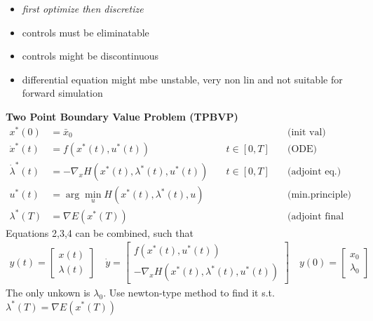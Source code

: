 
\begin{tcolorbox}[colback=gray!5!white,colframe=gray!75!black,title=\textbf{Indirect Approach}]
\begin{itemize}
	\item \textit{first optimize then discretize}
	\item controls must be eliminatable
	\item controls might be discontinuous
	\item differential equation might mbe unstable, very non lin and not suitable for forward simulation\\
\end{itemize}
\textbf{Two Point Boundary Value Problem (TPBVP)}
\begin{align*}
	x^*(0) &= \bar{x}_0 & & \text{(init val)}\\
	\dot{x}^*(t) &= f(x^*(t), u^*(t)) \quad &t \in [0, T] \quad & \text{(ODE)}\\
	\dot{\lambda}^*(t) &= - \nabla_x H(x^*(t), \lambda^*(t), u^*(t)) \quad & t \in [0, T] \quad & \text{(adjoint eq.)}\\
	u^*(t) &= \arg \min_u H(x^*(t), \lambda^*(t), u) & & \text{(min.principle)}\\
	\lambda^*(T) &= \nabla E(x^*(T)) & & \text{(adjoint final val)}
\end{align*}
Equations 2,3,4 can be combined, such that
\begin{align*}
	y(t) = \begin{bmatrix}
	x(t) \\ \lambda(t)
	\end{bmatrix}
	 \quad
	 \dot{y} =
	 \begin{bmatrix}
		 f(x^*(t), u^*(t))\\
		 - \nabla_x H(x^*(t), \lambda^*(t), u^*(t))
	 \end{bmatrix}
 	\quad
 	y(0) = \begin{bmatrix}
		x_0\\ \lambda_0
 	\end{bmatrix}
\end{align*}
The only unkown is $\lambda_0$. Use newton-type method to find it s.t. $\lambda^*(T) = \nabla E(x^*(T)) $
\end{tcolorbox}